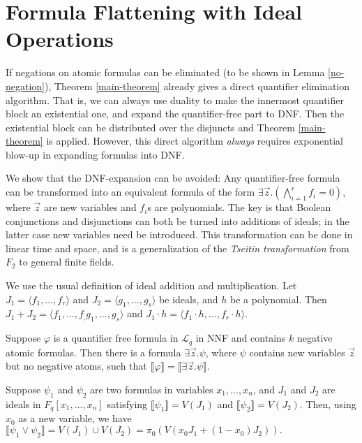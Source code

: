 \documentclass[envcountsect]{llncs}
\begin{document}
\section{Formula Flattening with Ideal Operations}

If negations on atomic formulas can be eliminated (to be shown in Lemma \ref{no-negation}), Theorem \ref{main-theorem} already gives a direct quantifier elimination algorithm. That is, we can always use duality to make the innermost quantifier block an existential one, and expand the quantifier-free part to DNF. Then the existential block can be distributed over the disjuncts and Theorem \ref{main-theorem} is applied. However, this direct algorithm {\em always} requires exponential blow-up in expanding formulas into DNF. 

We show that the DNF-expansion can be avoided: Any quantifier-free formula can be transformed into an equivalent formula of the form $\exists \vec z.(\bigwedge_{i=1}^r f_i=0)$, where $\vec z$ are new variables and $f_i$s are polynomials. The key is that Boolean conjunctions and disjunctions can both be turned into additions of ideals; in the latter case new variables need be introduced. This transformation can be done in linear time and space, and is a generalization of the {\em Tseitin transformation} from $F_2$ to general finite fields. 

We use the usual definition of ideal addition and multiplication. Let $J_1=\langle f_1,...,f_r\rangle$ and $J_2=\langle g_1,...,g_s\rangle$ be ideals, and $h$ be a polynomial. Then $J_1+J_2=\langle f_1,...,f_, g_1,...,g_s\rangle$ and $J_1\cdot h = \langle f_1\cdot h,...,f_r\cdot h\rangle$.

\begin{lemma}
Suppose $\varphi$ is a quantifier free formula in $\mathcal{L}_q$ in NNF and contains $k$ negative atomic formulas. Then there is a formula $\exists \vec z.\psi$, where $\psi$ contains new variables $\vec z$ but no negative atoms, such that $\llbracket \varphi \rrbracket = \llbracket \exists \vec z.\psi \rrbracket $.
\label{no-negation}\end{lemma}

\begin{lemma}\label{no-disjunction}
Suppose $\psi_1$ and $\psi_2$ are two formulas in variables $x_1,...,x_n$, and $J_1$ and $J_2$ are ideals in $F_q[x_1,...,x_n]$ satisfying $\llbracket \psi_1\rrbracket = V(J_1)$ and $\llbracket \psi_2 \rrbracket = V(J_2)$. Then, using $x_0$ as a new variable, we have $\llbracket \psi_1\vee \psi_2 \rrbracket = V(J_1)\cup V(J_2) =\pi_0( V(x_0 J_1+(1-x_0)J_2)).$
\end{lemma}
\end{document}
